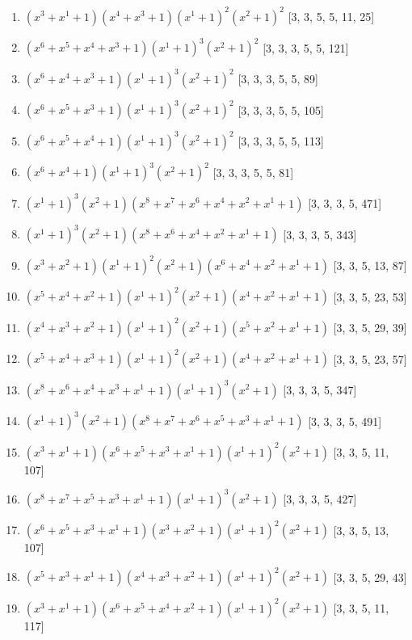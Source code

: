 \documentclass[10pt,twocolumn]{article}
\begin{document}
\begin{enumerate}
\item $(x^{3} + x^{1} + 1)(x^{4} + x^{3} + 1)(x^{1} + 1)^{2}(x^{2} + 1)^{2}$  [3, 3, 5, 5, 11, 25]
\item $(x^{6} + x^{5} + x^{4} + x^{3} + 1)(x^{1} + 1)^{3}(x^{2} + 1)^{2}$  [3, 3, 3, 5, 5, 121]
\item $(x^{6} + x^{4} + x^{3} + 1)(x^{1} + 1)^{3}(x^{2} + 1)^{2}$  [3, 3, 3, 5, 5, 89]
\item $(x^{6} + x^{5} + x^{3} + 1)(x^{1} + 1)^{3}(x^{2} + 1)^{2}$  [3, 3, 3, 5, 5, 105]
\item $(x^{6} + x^{5} + x^{4} + 1)(x^{1} + 1)^{3}(x^{2} + 1)^{2}$  [3, 3, 3, 5, 5, 113]
\item $(x^{6} + x^{4} + 1)(x^{1} + 1)^{3}(x^{2} + 1)^{2}$  [3, 3, 3, 5, 5, 81]
\item $(x^{1} + 1)^{3}(x^{2} + 1)(x^{8} + x^{7} + x^{6} + x^{4} + x^{2} + x^{1} + 1)$  [3, 3, 3, 5, 471]
\item $(x^{1} + 1)^{3}(x^{2} + 1)(x^{8} + x^{6} + x^{4} + x^{2} + x^{1} + 1)$  [3, 3, 3, 5, 343]
\item $(x^{3} + x^{2} + 1)(x^{1} + 1)^{2}(x^{2} + 1)(x^{6} + x^{4} + x^{2} + x^{1} + 1)$  [3, 3, 5, 13, 87]
\item $(x^{5} + x^{4} + x^{2} + 1)(x^{1} + 1)^{2}(x^{2} + 1)(x^{4} + x^{2} + x^{1} + 1)$  [3, 3, 5, 23, 53]
\item $(x^{4} + x^{3} + x^{2} + 1)(x^{1} + 1)^{2}(x^{2} + 1)(x^{5} + x^{2} + x^{1} + 1)$  [3, 3, 5, 29, 39]
\item $(x^{5} + x^{4} + x^{3} + 1)(x^{1} + 1)^{2}(x^{2} + 1)(x^{4} + x^{2} + x^{1} + 1)$  [3, 3, 5, 23, 57]
\item $(x^{8} + x^{6} + x^{4} + x^{3} + x^{1} + 1)(x^{1} + 1)^{3}(x^{2} + 1)$  [3, 3, 3, 5, 347]
\item $(x^{1} + 1)^{3}(x^{2} + 1)(x^{8} + x^{7} + x^{6} + x^{5} + x^{3} + x^{1} + 1)$  [3, 3, 3, 5, 491]
\item $(x^{3} + x^{1} + 1)(x^{6} + x^{5} + x^{3} + x^{1} + 1)(x^{1} + 1)^{2}(x^{2} + 1)$  [3, 3, 5, 11, 107]
\item $(x^{8} + x^{7} + x^{5} + x^{3} + x^{1} + 1)(x^{1} + 1)^{3}(x^{2} + 1)$  [3, 3, 3, 5, 427]
\item $(x^{6} + x^{5} + x^{3} + x^{1} + 1)(x^{3} + x^{2} + 1)(x^{1} + 1)^{2}(x^{2} + 1)$  [3, 3, 5, 13, 107]
\item $(x^{5} + x^{3} + x^{1} + 1)(x^{4} + x^{3} + x^{2} + 1)(x^{1} + 1)^{2}(x^{2} + 1)$  [3, 3, 5, 29, 43]
\item $(x^{3} + x^{1} + 1)(x^{6} + x^{5} + x^{4} + x^{2} + 1)(x^{1} + 1)^{2}(x^{2} + 1)$  [3, 3, 5, 11, 117]

\end{enumerate}
\end{document}
